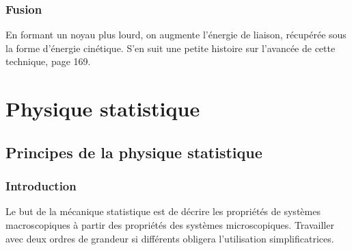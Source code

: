\documentclass[british,french,11pt, a4paper, openany]{book}
\begin{document}
\section{Fusion}
En formant un noyau plus lourd, on augmente l'énergie de liaison, récupérée sous la forme d'énergie
cinétique. S'en suit une petite histoire sur l'avancée de cette technique, page 169.



















\part{Physique statistique}
\setcounter{chapter}{12}
\chapter{Principes de la physique statistique}
\section{Introduction}
Le but de la mécanique statistique est de décrire les propriétés de systèmes macroscopiques à partir des 
propriétés des systèmes microscopiques. Travailler avec deux ordres de grandeur si différents obligera 
l'utilisation simplificatrices.
\end{document}
